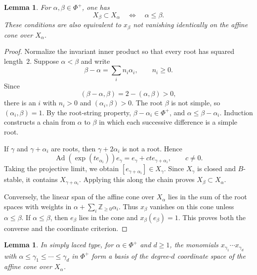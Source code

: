 \documentclass[12pt]{article}
\newtheorem{lemma}[theorem]{Lemma}
\theoremstyle{definition}
\DeclareMathOperator{\Ad}{Ad}
\begin{document}
\begin{lemma}\label{lem:rootorder}
    For $\alpha,\beta\in\Phi^+$, one has
    $$
        X_\beta\subset X_\alpha\quad\Longleftrightarrow\quad\alpha\leq\beta.
    $$
    These conditions are also equivalent to $x_\beta$ not vanishing identically on the affine cone over $X_\alpha$.
\end{lemma}

\begin{proof}
    Normalize the invariant inner product so that every root has squared length~$2$. Suppose $\alpha<\beta$ and write
    $$
        \beta-\alpha=\sum_i n_i\alpha_i,\qquad n_i\geq0.
    $$
    Since
    $$
        (\beta-\alpha,\beta)=2-(\alpha,\beta)>0,
    $$
    there is an $i$ with $n_i>0$ and $(\alpha_i,\beta)>0$. The root $\beta$ is not simple, so $(\alpha_i,\beta)=1$. By the root-string property, $\beta-\alpha_i\in\Phi^+$, and $\alpha\leq\beta-\alpha_i$. Induction constructs a chain from $\alpha$ to $\beta$ in which each successive difference is a simple root.

    If $\gamma$ and $\gamma+\alpha_i$ are roots, then $\gamma+2\alpha_i$ is not a root. Hence
    $$
        \Ad(\exp(t e_{\alpha_i}))e_\gamma
        =e_\gamma+c t e_{\gamma+\alpha_i},\qquad c\neq0.
    $$
    Taking the projective limit, we obtain $[e_{\gamma+\alpha_i}]\in X_\gamma$. Since $X_\gamma$ is closed and $B$-stable, it contains $X_{\gamma+\alpha_i}$. Applying this along the chain proves $X_\beta\subset X_\alpha$.

    Conversely, the linear span of the affine cone over $X_\alpha$ lies in the sum of the root spaces with weights in $\alpha+\sum_i\mathbb Z_{\geq0}\alpha_i$. Thus $x_\beta$ vanishes on this cone unless $\alpha\leq\beta$. If $\alpha\leq\beta$, then $e_\beta$ lies in the cone and $x_\beta(e_\beta)=1$. This proves both the converse and the coordinate criterion.
\end{proof}

\begin{lemma}\label{lem:smt}
    In simply laced type, for $\alpha\in\Phi^+$ and $d\geq1$, the monomials $x_{\gamma_1}\cdots x_{\gamma_d}$ with $\alpha\leq\gamma_1\leq\cdots\leq\gamma_d$ in $\Phi^+$ form a basis of the degree-$d$ coordinate space of the affine cone over $X_\alpha$.
\end{lemma}
\end{document}
